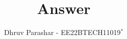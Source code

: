 \documentclass[journal,12pt,twocolumn]{IEEEtran}
\theoremstyle{remark}
\begin{document}
%




\vspace{3cm}

\title{
Answer 
}
\author{ Dhruv Parashar - EE22BTECH11019$^{*}$%
}	


%
%
%

% 
%



% 
\end{document}
